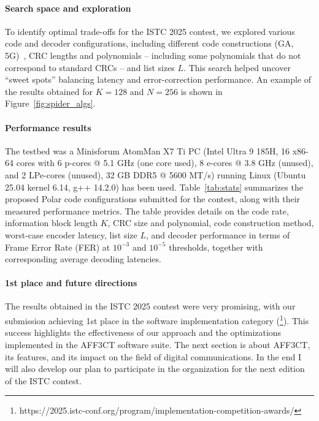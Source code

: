 \documentclass[11pt]{report}
\begin{document}


\paragraph{Search space and exploration}
\label{search}

To identify optimal trade-offs for the ISTC 2025 contest, we explored various code and decoder configurations, including different code constructions (GA, 5G)~\cite{Trifonov2012,ETSI2018}, CRC lengths and polynomials -- including some polynomials that do not correspond to standard CRCs -- and list sizes $L$. This search helped uncover ``sweet spots'' balancing latency and error-correction performance. An example of the results obtained for \(K = 128\) and \(N = 256\) is shown in Figure~\ref{fig:spider_algs}.

\paragraph{Performance results}

The testbed was a Minisforum AtomMan X7 Ti PC (Intel Ultra 9 185H, 16 x86-64 cores with 6 p-cores @ 5.1 GHz (one core used), 8 e-cores @ 3.8 GHz (unused), and 2 LPe-cores (unused), 32 GB DDR5 @ 5600 MT/s) running Linux (Ubuntu 25.04 kernel 6.14, g++ 14.2.0) has been used.
Table~\ref{tab:stats} summarizes the proposed Polar code configurations submitted for the contest, along with their measured performance metrics. The table provides details on the code rate, information block length \(K\), CRC size and polynomial, code construction method, worst-case encoder latency, list size \(L\), and decoder performance in terms of Frame Error Rate (FER) at \(10^{-3}\) and \(10^{-5}\) thresholds, together with corresponding average decoding latencies.

\paragraph{1st place and future directions}
The results obtained in the ISTC 2025 contest were very promising, with our submission achieving 1st place in the software implementation category (\footnote{https://2025.istc-conf.org/program/implementation-competition-awards/}). This success highlights the effectiveness of our approach and the optimizations implemented in the AFF3CT software suite.
The next section is about AFF3CT, its features, and its impact on the field of digital communications. In the end I will also develop our plan to participate in the organization for the next edition of the ISTC contest.
\end{document}
